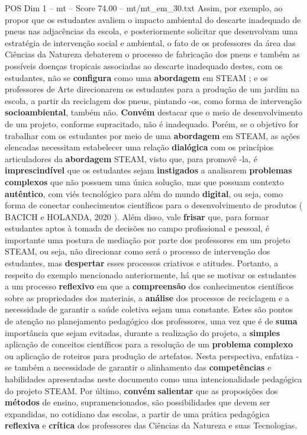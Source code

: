 \begin{textsample}{POS Dim 1 – mt – Score 74.00 – mt/mt\_em\_30.txt}
Assim, por exemplo, ao propor que os estudantes avaliem o impacto ambiental do descarte inadequado de pneus nas adjacências da escola, e posteriormente solicitar que desenvolvam uma estratégia de intervenção social e ambiental, o fato de os professores da área das Ciências da Natureza debaterem o processo de fabricação dos pneus e também as possíveis doenças tropicais associadas ao descarte inadequado destes, com os estudantes, não se \textbf{configura} como uma \textbf{abordagem} em STEAM ; e os professores de Arte direcionarem os estudantes para a produção de um jardim na escola, a partir da reciclagem dos pneus, pintando -os, como forma de intervenção \textbf{socioambiental}, também não. \textbf{Convém} destacar que o meio de desenvolvimento de um projeto, conforme supracitado, não é inadequado.
Porém, se o objetivo for trabalhar com os estudantes por meio de uma \textbf{abordagem} em STEAM, as ações elencadas necessitam estabelecer uma relação \textbf{dialógica} com os princípios articuladores da \textbf{abordagem} STEAM, visto que, para promovê -la, é \textbf{imprescindível} que os estudantes sejam \textbf{instigados} a analisarem \textbf{problemas} \textbf{complexos} que não possuem uma única solução, mas que possuam contexto \textbf{autêntico}, com viés tecnológico para além do mundo \textbf{digital}, ou seja, como forma de conectar conhecimentos científicos para o desenvolvimento de produtos ( BACICH e HOLANDA, 2020 ).
Além disso, vale \textbf{frisar} que, para formar estudantes aptos à tomada de decisões no campo profissional e pessoal, é importante uma postura de mediação por parte dos professores em um projeto STEAM, ou seja, não direcionar como será o processo de intervenção dos estudantes, mas \textbf{despertar} esses processos criativos e atitudes.
Portanto, a respeito do exemplo mencionado anteriormente, há que se motivar os estudantes a um processo \textbf{reflexivo} em que a \textbf{compreensão} dos conhecimentos científicos sobre as propriedades dos materiais, a \textbf{análise} dos processos de reciclagem e a necessidade de garantir a saúde coletiva sejam uma constante.
Estes são pontos de atenção no planejamento pedagógico dos professores, uma vez que é de \textbf{suma} importância que sejam evitadas, durante a realização do projeto, a \textbf{simples} aplicação de conceitos científicos para a resolução de um \textbf{problema} \textbf{complexo} ou aplicação de roteiros para produção de artefatos.
Nesta perspectiva, enfatiza -se também a necessidade de garantir o alinhamento das \textbf{competências} e habilidades apresentadas neste documento como uma intencionalidade pedagógica do projeto STEAM.
Por último, \textbf{convém} \textbf{salientar} que as proposições dos \textbf{métodos} de ensino, supramencionados, são possibilidades que devem ser expandidas, no cotidiano das escolas, a partir de uma prática pedagógica \textbf{reflexiva} e \textbf{crítica} dos professores das Ciências da Natureza e suas Tecnologias.


\end{textsample}
